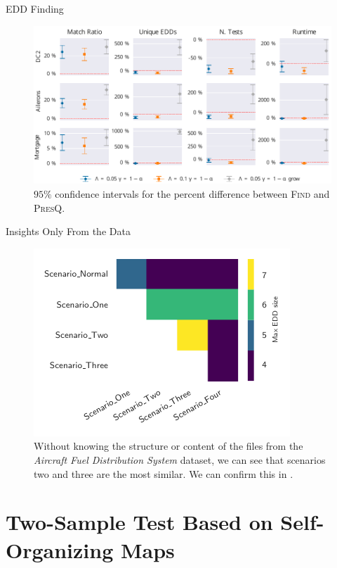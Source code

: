 \documentclass[10pt]{beamer}
\newcommand{\PresQ}[0]{\textsc{PresQ}\xspace}
\begin{document}
\begin{frame}{EDD Finding}
\begin{figure}
    \centering
    \includegraphics[width=\textwidth]{all}
    \caption{$95\%$ confidence intervals for the percent difference
    between \textsc{Find} and \PresQ.}
\end{figure}

\end{frame}

\begin{frame}{Insights Only From the Data}
\begin{figure}
    \centering
    \includegraphics[width=.6\textwidth]{aircraft-cross}
    \caption{
        Without knowing the structure or content of the files from the \emph{Aircraft Fuel Distribution System}
        dataset, we can see that scenarios two and three are the most similar. We can confirm this in
        \cite{Gheraibia2019}.
    }
\end{figure}
\end{frame}

\section{Two-Sample Test Based on Self-Organizing Maps}
\end{document}
